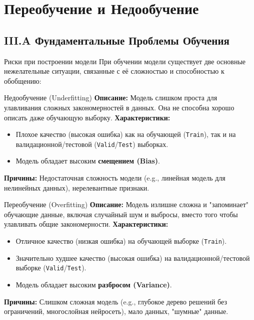 \section{Переобучение и Недообучение}

\subsection{III.A Фундаментальные Проблемы Обучения}
\begin{alerttextbox}{Риски при построении модели}
    При обучении модели существует две основные нежелательные ситуации, связанные с её сложностью и способностью к обобщению:
\end{alerttextbox}

\begin{myblock}{Недообучение (Underfitting)}
    \textbf{Описание:} Модель слишком проста для улавливания сложных закономерностей в данных. Она не способна хорошо описать даже обучающую выборку.
    \textbf{Характеристики:}
    \begin{itemize}[nosep, leftmargin=*]
        \item Плохое качество (высокая ошибка) как на обучающей (\texttt{Train}), так и на валидационной/тестовой (\texttt{Valid}/\texttt{Test}) выборках.
        \item Модель обладает высоким \textbf{смещением (Bias)}.
    \end{itemize}
    \textbf{Причины:} Недостаточная сложность модели (e.g., линейная модель для нелинейных данных), нерелевантные признаки.
\end{myblock}

\begin{myblock}{Переобучение (Overfitting)}
    \textbf{Описание:} Модель излишне сложна и "запоминает" обучающие данные, включая случайный шум и выбросы, вместо того чтобы улавливать общие закономерности.
    \textbf{Характеристики:}
    \begin{itemize}[nosep, leftmargin=*]
        \item Отличное качество (низкая ошибка) на обучающей выборке (\texttt{Train}).
        \item Значительно худшее качество (высокая ошибка) на валидационной/тестовой выборке (\texttt{Valid}/\texttt{Test}).
        \item Модель обладает высоким \textbf{разбросом (Variance)}.
    \end{itemize}
    \textbf{Причины:} Слишком сложная модель (e.g., глубокое дерево решений без ограничений, многослойная нейросеть), мало данных, "шумные" данные.
\end{myblock}

